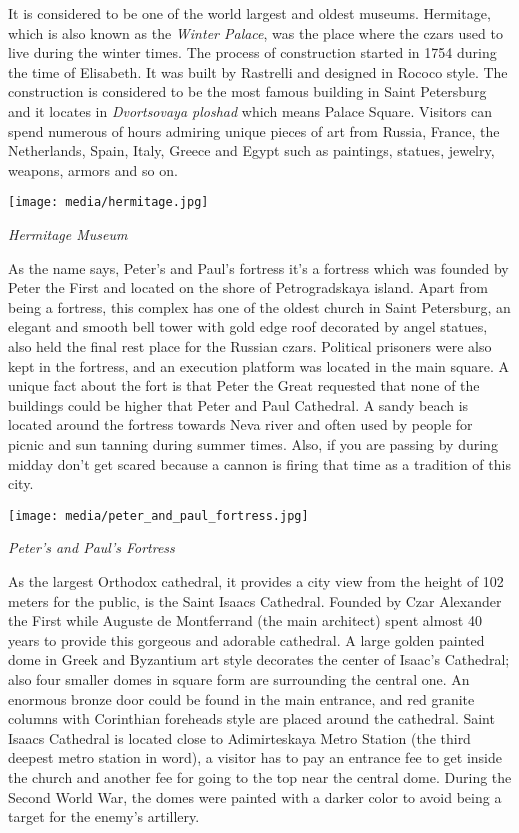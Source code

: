 \documentclass[10pt,a4paper]{article} %
\begin{document}
\begin{multicols}{3}
It is considered to be one of the world largest and oldest museums. 
Hermitage, which is also known as the \textit{Winter Palace}, 
was the place where the czars used to live during the winter times. 
The process of construction started in 1754 during the time of Elisabeth. 
It was built by Rastrelli and designed in Rococo style. 
The construction is considered to be the most famous building in Saint Petersburg 
and it locates in \textit{Dvortsovaya ploshad} which means Palace Square. 
Visitors can spend numerous of hours admiring unique pieces of art from Russia, France, 
the Netherlands, Spain, Italy, Greece and Egypt such as paintings, statues, 
jewelry, weapons, armors and so on.

\begin{center}
\texttt{[image: media/hermitage.jpg]}
\par\textit{Hermitage Museum}
\end{center}

As the name says, Peter's and Paul's fortress it's a fortress which was founded 
by Peter the First and located on the shore of Petrogradskaya island. 
Apart from being a fortress, this complex has one of the oldest church in Saint Petersburg, 
an elegant and smooth bell tower with gold edge roof decorated by angel statues, 
also held the final rest place for the Russian czars. 
Political prisoners were also kept in the fortress, and an execution platform was 
located in the main square.
A unique fact about the fort is that Peter the Great requested that 
none of the buildings could be higher that Peter and Paul Cathedral. 
A sandy beach is located around the fortress towards Neva river and often used by people 
for picnic and sun tanning during summer times. 
Also, if you are passing by during midday don't get scared because a cannon is firing 
that time as a tradition of this city.

\begin{center}
	\texttt{[image: media/peter\_and\_paul\_fortress.jpg]}
	\par\textit{Peter's and Paul's Fortress}
\end{center}

As the largest Orthodox cathedral, it provides a city view 
from the height of 102 meters for the public, is the Saint Isaacs Cathedral. 
Founded by Czar Alexander the First while Auguste de Montferrand (the main architect) 
spent almost 40 years to provide this gorgeous and adorable cathedral. 
A large golden painted dome in Greek and Byzantium art style decorates the 
center of Isaac's Cathedral; 
also four smaller domes in square form are surrounding the central one. 
An enormous bronze door could be found in the main entrance, and red granite columns 
with Corinthian foreheads style are placed around the cathedral. 
Saint Isaacs Cathedral is located close to Adimirteskaya Metro Station
(the third deepest metro station in word), 
a visitor has to pay an entrance fee to get inside the church and another 
fee for going to the top near the central dome. 
During the Second World War, the domes were painted with a darker color 
to avoid being a target for the enemy's artillery.


\end{multicols}
\end{document}
